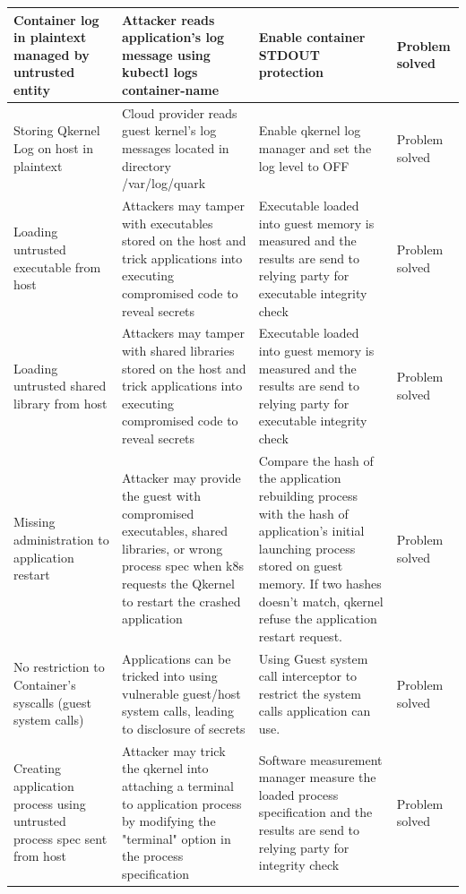 \begin{table}[H]
\begin{tabular}{  p{3.4cm}  p{3.4cm}  p{3.4cm} p{2cm} }
Container log in plaintext managed by untrusted entity
& Attacker reads application’s log message using kubectl logs container-name
& Enable container STDOUT protection
& Problem solved  \\\hline

Storing Qkernel Log on host in plaintext
& Cloud provider reads guest kernel’s log messages located in directory /var/log/quark
& Enable qkernel log manager and set the log level to OFF
& Problem solved  \\\hline

Loading untrusted executable from host
& Attackers may tamper with executables stored on the host and trick applications into executing compromised code to reveal secrets
& Executable loaded into guest memory is measured and the results are send to relying party for executable integrity check
& Problem solved  \\\hline

Loading untrusted shared library from host
& Attackers may tamper with shared libraries stored on the host and trick applications into executing compromised code to reveal secrets
& Executable loaded into guest memory is measured and the results are send to relying party for executable integrity check
& Problem solved  \\\hline

Missing administration to application restart
& Attacker may provide the guest with compromised executables, shared libraries, or wrong process spec when k8s requests the Qkernel to restart the crashed application
& Compare the hash of the application rebuilding process with the hash of application's initial launching process stored on guest memory. If two hashes doesn’t match,  qkernel refuse the application restart request.
& Problem solved  \\\hline


No restriction to Container's syscalls (guest system calls)
& Applications can be tricked into using vulnerable guest/host system calls, leading to disclosure of secrets
& Using Guest system call interceptor to restrict the system calls application can use.
& Problem solved  \\\hline


Creating application process using untrusted process spec sent from host
& Attacker may trick the qkernel into attaching a terminal to application process by modifying the "terminal" option in the process specification
& Software measurement manager measure the loaded process specification and the results are send to relying party for integrity check
& Problem solved  \\\hline



\end{tabular}
\end{table}
